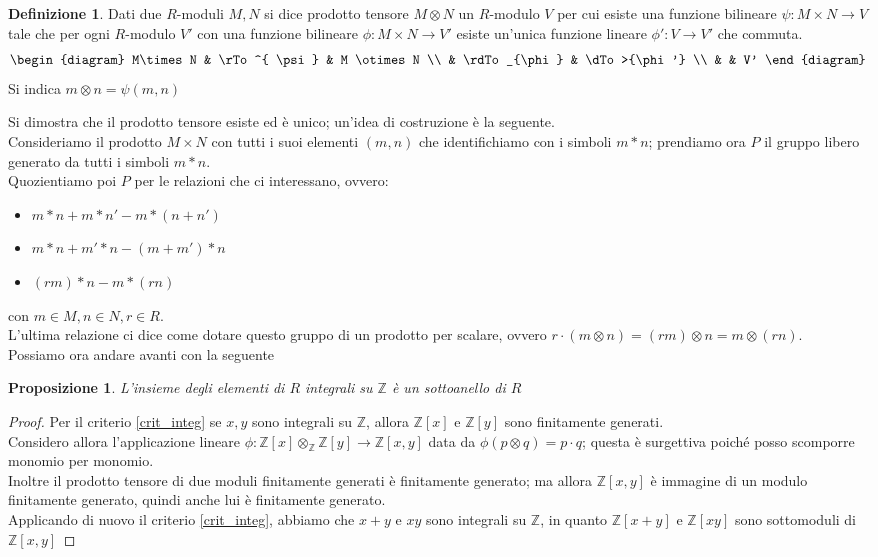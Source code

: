 \documentclass[11pt]{article}
\theoremstyle{plain}
\newtheorem{prop}[thm]{Proposizione}
\theoremstyle{definition}
\newtheorem{defn}{Definizione}[section]
\theoremstyle{remark}
\newcommand{\Z}{\mathbb{Z}}
\newcommand{\tridiag}[6]{
	  \begin{diagram}
	  #1 & \rTo^{#2}  & #3        \\
	     & \rdTo_{#6} & \dTo>{#4}   \\
	     &          & #5
	  \end{diagram}
}
\begin{document}
  \begin{defn}
   Dati due $R$-moduli $M,N$ si dice prodotto tensore $M\otimes N$ un $R$-modulo $V$ per cui esiste una funzione bilineare $\psi:M\times N\to V$ tale che per ogni $R$-modulo $V'$ con una funzione bilineare $\phi:M\times N\to V'$ esiste un'unica funzione lineare $\phi':V\to V'$ che commuta.
   \[\tridiag{M\times N}{ \psi }{M \otimes N}{\phi'}{V'}{\phi}\]
   Si indica $m\otimes n=\psi(m,n)$
  \end{defn}
  Si dimostra che il prodotto tensore esiste ed è unico; un'idea di costruzione è la seguente.\\
  Consideriamo il prodotto $M\times N$ con tutti i suoi elementi $(m,n)$ che identifichiamo con i simboli $m\ast n$; prendiamo ora $P$ il gruppo libero generato da tutti i simboli $m\ast n$.\\
  Quozientiamo poi $P$ per le relazioni che ci interessano, ovvero:
  \begin{itemize}
   \item $m\ast n+m\ast n'-m\ast(n+n')$
   \item $m\ast n+m'\ast n-(m+m')\ast n$
   \item $(rm)\ast n-m\ast(rn)$
  \end{itemize}
  con $m\in M,n\in N,r\in R$.\\
  L'ultima relazione ci dice come dotare questo gruppo di un prodotto per scalare, ovvero $r\cdot(m\otimes n)=(rm)\otimes n=m\otimes(rn)$.\\
  Possiamo ora andare avanti con la seguente
  \begin{prop}
   L'insieme degli elementi di $R$ integrali su $\Z$ è un sottoanello di $R$
  \end{prop}
  \begin{proof}
   Per il criterio \ref{crit_integ} se $x,y$ sono integrali su $\Z$, allora $\Z[x]$ e $\Z[y]$ sono finitamente generati.\\
   Considero allora l'applicazione lineare $\phi:\Z[x]\otimes_\Z\Z[y]\to\Z[x,y]$ data da $\phi(p\otimes q)=p\cdot q$; questa è surgettiva poiché posso scomporre monomio per monomio.\\
   Inoltre il prodotto tensore di due moduli finitamente generati è finitamente generato; ma allora $\Z[x,y]$ è immagine di un modulo finitamente generato, quindi anche lui è finitamente generato.\\
   Applicando di nuovo il criterio \ref{crit_integ}, abbiamo che $x+y$ e $xy$ sono integrali su $\Z$, in quanto $\Z[x+y]$ e $\Z[xy]$ sono sottomoduli di $\Z[x,y]$
  \end{proof}
\end{document}
